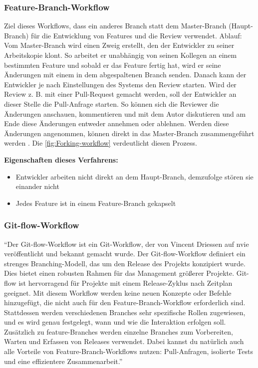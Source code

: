 \subsubsection{Feature-Branch-Workflow}
\label{subsubsec:Feature-Branch-Workflow}

Ziel dieses Workflows, dass ein anderes Branch statt dem Master-Branch (Haupt-Branch) für die Entwicklung von Features und die Review verwendet.
Ablauf: Vom Master-Branch wird einen Zweig erstellt, den der Entwickler zu seiner Arbeitskopie klont. So arbeitet er unabhängig von seinen Kollegen an einem bestimmten Feature und 		sobald er das Feature fertig hat, wird er seine Änderungen mit einem  in dem abgespaltenen Branch senden. Danach kann der Entwickler je nach Einstellungen des Systems den 	Review starten. Wird der Review z. B. mit einer Pull-Request gemacht werden, soll der Entwickler an dieser Stelle die Pull-Anfrage starten. So können sich die Reviewer die 				Änderungen anschauen, kommentieren und mit dem Autor diskutieren und am Ende diese Änderungen entweder annehmen oder ablehnen. Werden diese Änderungen angenommen, können direkt in 		das Master-Branch zusammengeführt werden \cite{Feature-Branch-Workflow}. Die \cref{fig:Forking-workflow} verdeutlicht diesen Prozess. 

\textbf{Eigenschaften dieses Verfahrens:}
\begin{itemize}
	\item Entwickler arbeiten nicht direkt an dem Haupt-Branch, demzufolge stören sie einander nicht
	\item Jedes Feature ist in einem Feature-Branch gekapselt
\end{itemize}

\subsubsection{Git-flow-Workflow}
\label{subsubsec:Git-flow-Workflow}

"`Der Git-flow-Workflow ist ein Git-Workflow, der von Vincent Driessen auf nvie veröffentlicht und bekannt gemacht wurde. Der Git-flow-Workflow definiert ein strenges Branching-Modell, das um den Release des Projekts konzipiert wurde. Dies bietet einen robusten Rahmen für das Management größerer Projekte.
Git-flow ist hervorragend für Projekte mit einem Release-Zyklus nach Zeitplan geeignet. Mit diesem Workflow werden keine neuen Konzepte oder Befehle hinzugefügt, die nicht auch für 		den Feature-Branch-Workflow erforderlich sind. Stattdessen werden verschiedenen Branches sehr spezifische Rollen zugewiesen, und es wird genau festgelegt, wann und wie die 				Interaktion erfolgen soll. Zusätzlich zu feature-Branches werden einzelne Branches zum Vorbereiten, Warten und Erfassen von Releases verwendet. Dabei kannst du natürlich auch alle 		Vorteile von Feature-Branch-Workflows nutzen: Pull-Anfragen, isolierte Tests und eine effizientere Zusammenarbeit."' \cite{Git-flow-Workflow}

